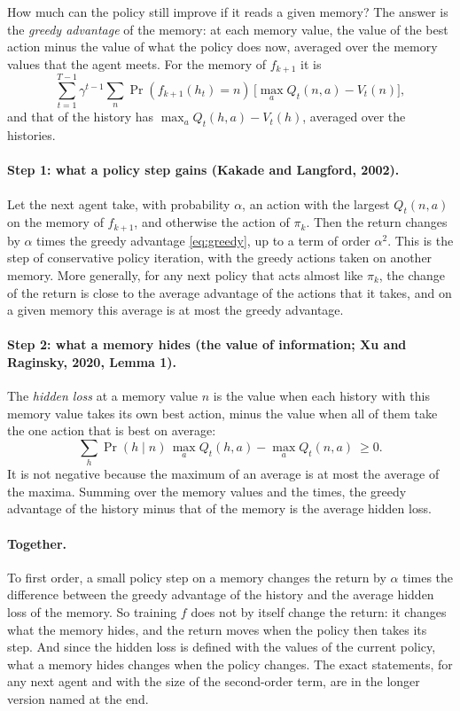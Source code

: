 \documentclass[11pt]{article}
\theoremstyle{definition}
\begin{document}
How much can the policy still improve if it reads a given memory? The answer is the \emph{greedy advantage} of the memory: at each memory value, the value of the best action minus the value of what the policy does now, averaged over the memory values that the agent meets. For the memory of $f_{k+1}$ it is
\begin{equation}\label{eq:greedy}
\sum_{t=1}^{T-1}\gamma^{t-1}\sum_n\Pr(f_{k+1}(h_t)=n)\,\big[\max_aQ_t(n,a)-V_t(n)\big],
\end{equation}
and that of the history has $\max_aQ_t(h,a)-V_t(h)$, averaged over the histories.

\paragraph{Step 1: what a policy step gains (Kakade and Langford, 2002).} Let the next agent take, with probability $\alpha$, an action with the largest $Q_t(n,a)$ on the memory of $f_{k+1}$, and otherwise the action of $\pi_k$. Then the return changes by $\alpha$ times the greedy advantage \eqref{eq:greedy}, up to a term of order $\alpha^2$. This is the step of conservative policy iteration, with the greedy actions taken on another memory. More generally, for any next policy that acts almost like $\pi_k$, the change of the return is close to the average advantage of the actions that it takes, and on a given memory this average is at most the greedy advantage.

\paragraph{Step 2: what a memory hides (the value of information; Xu and Raginsky, 2020, Lemma 1).} The \emph{hidden loss} at a memory value $n$ is the value when each history with this memory value takes its own best action, minus the value when all of them take the one action that is best on average:
\begin{equation}\label{eq:loss}
\sum_h\Pr(h\mid n)\,\max_aQ_t(h,a)-\max_aQ_t(n,a)\ \ge0 .
\end{equation}
It is not negative because the maximum of an average is at most the average of the maxima. Summing over the memory values and the times, the greedy advantage of the history minus that of the memory is the average hidden loss.

\paragraph{Together.} To first order, a small policy step on a memory changes the return by $\alpha$ times the difference between the greedy advantage of the history and the average hidden loss of the memory. So training $f$ does not by itself change the return: it changes what the memory hides, and the return moves when the policy then takes its step. And since the hidden loss is defined with the values of the current policy, what a memory hides changes when the policy changes. The exact statements, for any next agent and with the size of the second-order term, are in the longer version named at the end.
\end{document}
